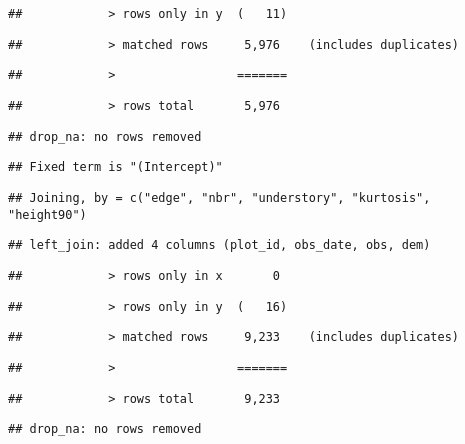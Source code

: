 \documentclass[
]{article}
\begin{document}
\begin{verbatim}
##            > rows only in y  (   11)
\end{verbatim}

\begin{verbatim}
##            > matched rows     5,976    (includes duplicates)
\end{verbatim}

\begin{verbatim}
##            >                 =======
\end{verbatim}

\begin{verbatim}
##            > rows total       5,976
\end{verbatim}

\begin{verbatim}
## drop_na: no rows removed
\end{verbatim}

\begin{verbatim}
## Fixed term is "(Intercept)"
\end{verbatim}

\begin{verbatim}
## Joining, by = c("edge", "nbr", "understory", "kurtosis", "height90")
\end{verbatim}

\begin{verbatim}
## left_join: added 4 columns (plot_id, obs_date, obs, dem)
\end{verbatim}

\begin{verbatim}
##            > rows only in x       0
\end{verbatim}

\begin{verbatim}
##            > rows only in y  (   16)
\end{verbatim}

\begin{verbatim}
##            > matched rows     9,233    (includes duplicates)
\end{verbatim}

\begin{verbatim}
##            >                 =======
\end{verbatim}

\begin{verbatim}
##            > rows total       9,233
\end{verbatim}

\begin{verbatim}
## drop_na: no rows removed
\end{verbatim}
\end{document}
